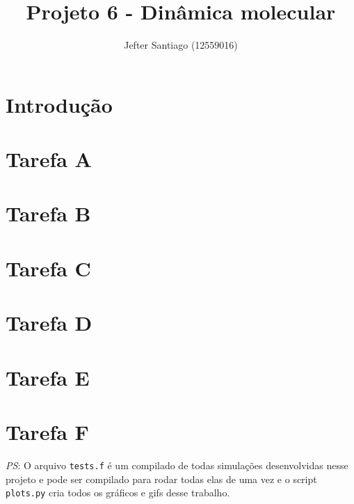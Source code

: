 \documentclass[a4paper, 13pt]{article}
\title{\color{blue}Projeto 6 - Dinâmica molecular}
\author{Jefter Santiago (12559016)}
\begin{document}
\maketitle
\section{Introdução}

\clearpage
\section{Tarefa A}

\section{Tarefa B}
\label{sec:sec_b}

\section{Tarefa C}
\label{sec:sec_C}

\section{Tarefa D}

\section{Tarefa E}
\label{sec:secE}

\section{Tarefa F}



\emph{PS}: O arquivo \verb|tests.f| é um compilado de todas simulações desenvolvidas nesse projeto 
e pode ser compilado para rodar todas elas de uma vez e o script \verb|plots.py| cria todos 
os gráficos e gifs desse trabalho.


\nocite{*}
\printbibliography[title = Referências]
\end{document}
